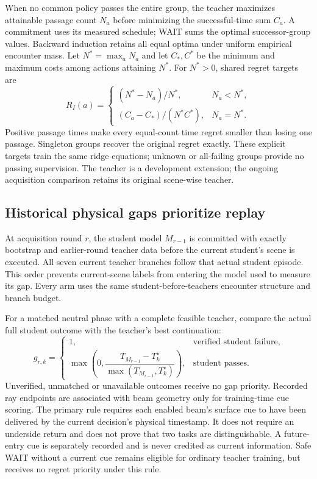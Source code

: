 \documentclass[10pt]{article}
\begin{document}
When no common policy passes the entire group, the teacher maximizes attainable
passage count $N_a$ before minimizing the successful-time sum $C_a$. A commitment
uses its measured schedule; WAIT sums the optimal successor-group values.
Backward induction retains all equal optima under uniform empirical encounter
mass. Let $N^*=\max_a N_a$ and let $C_*,C^*$ be the minimum and maximum costs
among actions attaining $N^*$. For $N^*>0$, shared regret targets are
\begin{equation}
 R_I(a)=\begin{cases}
 (N^*-N_a)/N^*,&N_a<N^*,\\
 (C_a-C_*)/(N^*C^*),&N_a=N^*.
 \end{cases}
\end{equation}
Positive passage times make every equal-count time regret smaller than losing
one passage. Singleton groups recover the original regret exactly. These
explicit targets train the same ridge equations; unknown or all-failing groups
provide no passing supervision. The teacher is a development extension;
the ongoing acquisition comparison retains its original scene-wise teacher.

\subsection{Historical physical gaps prioritize replay}
At acquisition round $r$, the student model $M_{r-1}$ is committed with exactly
bootstrap and earlier-round teacher data before the current student's scene is
executed. All seven current teacher branches follow that actual student episode.
This order prevents current-scene labels from entering the model used to measure
its gap. Every arm uses the same student-before-teachers encounter structure
and branch budget.

For a matched neutral phase with a complete feasible teacher, compare the actual
full student outcome with the teacher's best continuation:
\begin{equation}
 g_{r,k}=\begin{cases}
 1,&\text{verified student failure},\\
 \max\!\left(0,\dfrac{T_{M_{r-1}}-T_k^\star}
 {\max(T_{M_{r-1}},T_k^\star)}\right),&\text{student passes}.
 \end{cases}
\end{equation}
Unverified, unmatched or unavailable outcomes receive no gap priority. Recorded
ray endpoints are associated with beam geometry only for training-time cue scoring.
The primary rule requires each enabled beam's surface cue to have been delivered
by the current decision's physical timestamp. It does not require an underside
return and does not prove that two tasks are distinguishable. A future-entry cue
is separately recorded and is never credited as current information. Safe WAIT
without a current cue remains eligible for ordinary teacher training, but receives
no regret priority under this rule.
\end{document}
